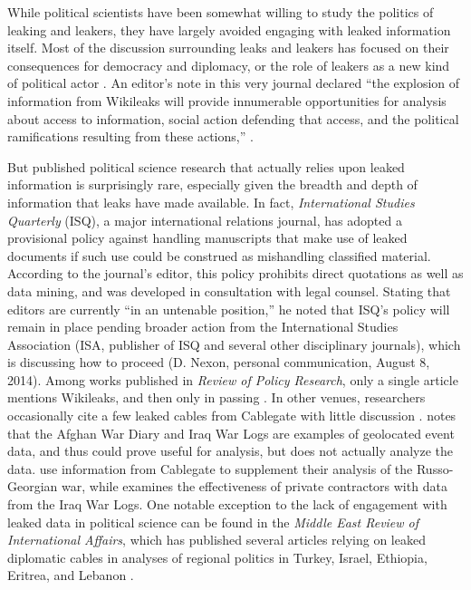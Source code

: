 \documentclass[12pt]{article}
\begin{document}
While political scientists have been somewhat willing to study the politics of leaking and leakers, 
they have largely avoided engaging with leaked information itself.
Most of the discussion surrounding leaks and leakers has focused on 
their consequences for democracy and diplomacy, or the role of 
leakers as a new kind of political actor \citep{simmons2011international,
davis2012political,pieterse2012leaking,springer2012leaky,
wong2013e-bandits}. An editor's note in this very journal declared ``the explosion of information 
from Wikileaks will provide innumerable opportunities for analysis about access to information, social action 
defending that access, and the political ramifications resulting from these actions,'' \citep[123]{gore2011editors}.

But published political science research that actually relies upon leaked information is surprisingly rare, especially given the breadth and depth of information that leaks have made 
available. 
In fact, \emph{International Studies Quarterly} (ISQ), a major international relations journal, has adopted a provisional policy against handling manuscripts that make use of leaked documents if such use could be construed as mishandling classified material. According to the journal's editor, this policy prohibits direct quotations as well as data mining, and was developed in consultation with legal counsel. Stating that editors are currently ``in an untenable position,'' he noted that ISQ's policy will remain in place pending broader action from the International Studies Association (ISA, publisher of ISQ and several other disciplinary journals), which is discussing how to proceed (D. Nexon, personal communication, August 8, 2014).
Among works published in \textit{Review of Policy Research}, only a single article mentions Wikileaks, and then only in passing \citep{kingiri2012role}.
In other venues, researchers occasionally cite a few leaked cables from 
Cablegate with little discussion \citep{bowen2011irans,guliyev2012political}.
\citet{schrodt2012precedents} notes that the Afghan War Diary and Iraq War Logs are examples of 
geolocated event data, and thus could prove useful for analysis, but does not actually analyze the 
data.
\citet{mouritzen2012explaining} use information from Cablegate to supplement their analysis of the 
Russo-Georgian war, while
\citet{petersohn2013effectiveness} examines the effectiveness of private contractors with data from the 
Iraq War Logs. 
One notable exception to the lack of engagement with leaked data in political science 
can be found in the \emph{Middle East Review of International Affairs}, which has published several 
articles relying on leaked diplomatic cables in analyses of regional politics in Turkey, Israel, 
Ethiopia, Eritrea, and Lebanon \citep{altiparmak2011wikileaks,
spyer2011israel,lefebvre2012choosing,smyth2011``independent}.
\end{document}
